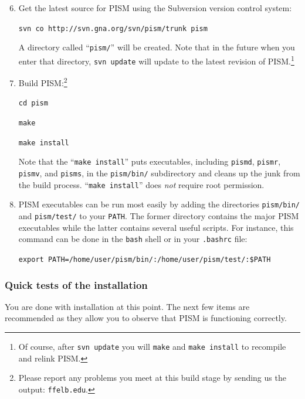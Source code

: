 \documentclass[11pt,final]{amsart}
\renewcommand{\t}[1]{\texttt{#1}}
\begin{document}
\begin{enumerate}\setcounter{enumi}{5}
\item \label{getPISMstep} Get the latest source for PISM using the Subversion version control system:

\verb|svn co http://svn.gna.org/svn/pism/trunk pism|

\noindent A directory called ``\verb|pism/|'' will be created.  Note that in the future when you enter that directory, \verb|svn update| will update to the latest revision of PISM.\footnote{Of course, after \t{svn update} you will \t{make} and \t{make install} to recompile and relink PISM.}

\item Build PISM:\footnote{Please report any problems you meet at this build stage by sending us the output: \t{ffelb\@@uaf.edu}.}

\verb|cd pism|

\verb|make|

\verb|make install|

\noindent  Note that the ``\verb|make install|'' puts executables, including \verb|pismd|, \verb|pismr|, \verb|pismv|, and \verb|pisms|, in the \verb|pism/bin/| subdirectory and cleans up the junk from the build process.  ``\verb|make install|'' does \emph{not} require root permission.

\item PISM executables can be run most easily by adding the directories \verb|pism/bin/| and \verb|pism/test/| to your \verb|PATH|.  The former directory contains the major PISM executables while the latter contains several useful scripts.  For instance, this command can be done in the \verb|bash| shell or in your \verb|.bashrc| file:

\verb|export PATH=/home/user/pism/bin/:/home/user/pism/test/:$PATH|
\end{enumerate}
\smallskip


\subsubsection*{Quick tests of the installation}
You are done with installation at this point.  The next few items are recommended as they allow you to observe that PISM is functioning correctly.
\medskip
\end{document}
